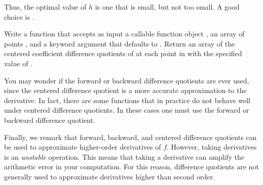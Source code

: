 Thus, the optimal value of $h$ is one that is small, but not too small. A good choice is .

\begin{problem}
Write a function that accepts as input a callable function object , an array of points , and
a keyword argument  that defaults to . 
Return an array of the centered coefficient difference quotients of  at each point in  with the specified value of .
\end{problem}

You may wonder if the forward or backward difference quotients are ever used, since the centered difference quotient is a more accurate approximation to the derivative.
In fact, there are some functions that in practice do not behave well under centered difference quotients.
In these cases one must use the forward or backward difference quotient.


Finally, we remark that forward, backward, and centered difference quotients can be used to approximate higher-order derivatives of $f$.
However, taking derivatives is an \emph{unstable} operation. 
This means that taking a derivative can amplify the arithmetic error in your computation.
For this reason, difference quotients are not generally used  to approximate derivatives higher than second order.





